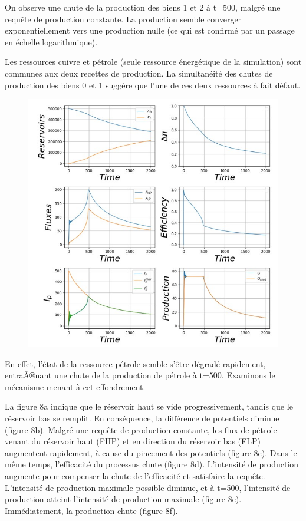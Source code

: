 \documentclass[12pt,a4paper]{article}%
\begin{document}
On observe une chute de la production des biens 1 et 2 à t=500, malgré une
requête de production constante. La production semble converger
exponentiellement vers une production nulle (ce qui est confirmé par un
passage en échelle logarithmique).

Les ressources cuivre et pétrole (seule ressource énergétique de la
simulation) sont communes aux deux recettes de production. La simultanéité des
chutes de production des biens 0 et 1 suggère que l'une de ces deux
ressources à fait défaut.

\begin{figure}[h]\centering  \includegraphics[width=1.0\textwidth]{figures/Tableau-Bord8.jpg}\end{figure}

En effet, l'état de la ressource pétrole semble s'être dégradé rapidement,
entraÃ®nant une chute de la production de pétrole à t=500. Examinons le
mécanisme menant à cet effondrement.

La figure 8a indique que le réservoir haut se vide progressivement, tandis que
le réservoir bas se remplit. En conséquence, la différence de potentiels
diminue (figure 8b). Malgré une requête de production constante, les flux de
pétrole venant du réservoir haut (FHP) et en direction du réservoir bas (FLP)
augmentent rapidement, à cause du pincement des potentiels (figure 8c).
Dans le même temps, l'efficacité du processus chute (figure 8d). L'intensité
de production augmente pour compenser la chute de l'efficacité et satisfaire
la requête. L'intensité de production maximale possible diminue, et à
t=500, l'intensité de production atteint l'intensité de production maximale
(figure 8e). Immédiatement, la production chute (figure 8f).
\end{document}
